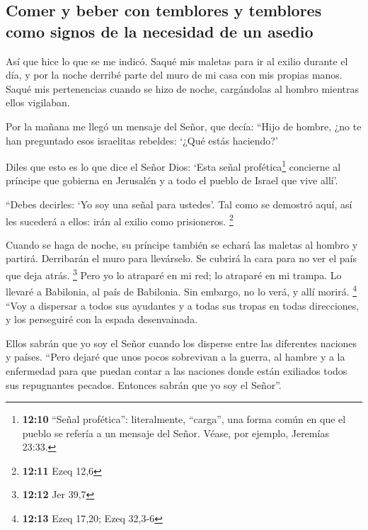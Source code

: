 \hypertarget{comer-y-beber-con-temblores-y-temblores-como-signos-de-la-necesidad-de-un-asedio}{%
\subsection{Comer y beber con temblores y temblores como signos de la
necesidad de un
asedio}\label{comer-y-beber-con-temblores-y-temblores-como-signos-de-la-necesidad-de-un-asedio}}

 Así que hice lo que se me indicó. Saqué mis maletas para
ir al exilio durante el día, y por la noche derribé parte del muro de mi
casa con mis propias manos. Saqué mis pertenencias cuando se hizo de
noche, cargándolas al hombro mientras ellos vigilaban.

 Por la mañana me llegó un mensaje del Señor, que decía:
 ``Hijo de hombre, ¿no te han preguntado esos israelitas
rebeldes: `¿Qué estás haciendo?'

 Diles que esto es lo que dice el Señor Dios: `Esta señal
profética\footnote{\textbf{12:10} ``Señal profética'': literalmente,
  ``carga'', una forma común en que el pueblo se refería a un mensaje
  del Señor. Véase, por ejemplo, Jeremías 23:33.} concierne al príncipe
que gobierna en Jerusalén y a todo el pueblo de Israel que vive allí'.

 ``Debes decirles: `Yo soy una señal para ustedes'. Tal
como se demostró aquí, así les sucederá a ellos: irán al exilio como
prisioneros. \footnote{\textbf{12:11} Ezeq 12,6}

 Cuando se haga de noche, su príncipe también se echará
las maletas al hombro y partirá. Derribarán el muro para llevárselo. Se
cubrirá la cara para no ver el país que deja atrás. \footnote{\textbf{12:12}
  Jer 39,7}  Pero yo lo atraparé en mi red; lo atraparé
en mi trampa. Lo llevaré a Babilonia, al país de Babilonia. Sin embargo,
no lo verá, y allí morirá. \footnote{\textbf{12:13} Ezeq 17,20; Ezeq
  32,3-6}  ``Voy a dispersar a todos sus ayudantes y a
todas sus tropas en todas direcciones, y los perseguiré con la espada
desenvainada.

 Ellos sabrán que yo soy el Señor cuando los disperse
entre las diferentes naciones y países.  ``Pero dejaré
que unos pocos sobrevivan a la guerra, al hambre y a la enfermedad para
que puedan contar a las naciones donde están exiliados todos sus
repugnantes pecados. Entonces sabrán que yo soy el Señor''.

